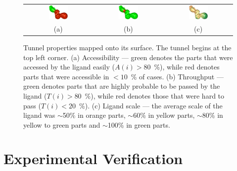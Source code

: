 \documentclass[usletter, 10pt, conference]{ieeeconf} %
\newcommand{\tylde}{$\sim$}
\begin{document}
\begin{figure}[h]
\centering
\begin{tabular}{ccc}
\includegraphics[width=0.3\textwidth]{fig/accessibility} &
\includegraphics[width=0.3\textwidth]{fig/throughput} &
\includegraphics[width=0.3\textwidth]{fig/ligand-scale} \\
  (a) & (b) & (c) \\                     
\end{tabular}
\caption{Tunnel properties mapped onto its surface. The tunnel begins at the top left corner.
(a) Accessibility --- green denotes the parts that were accessed by the ligand easily ($A(i) > 80$~\%), 
    while red denotes parts that were accessible  in $<10$~\% of cases.
(b) Throughput --- green denotes parts that are highly probable to be passed by the ligand ($T(i) > 80$~\%), 
    while red denotes those that were hard to pass ($T(i) < 20$~\%).
(c) Ligand scale --- the average scale of the ligand was \tylde 50\% in orange parts, \tylde 60\% in yellow parts, \tylde 80\% in yellow to green parts and \tylde 100\% in green parts.
\label{fig:properties}
}
\end{figure}



\def\cstart{\overline{c_{start}}}
\def\cend{\overline{c_{end}}}



\section{Experimental Verification}
\end{document}

